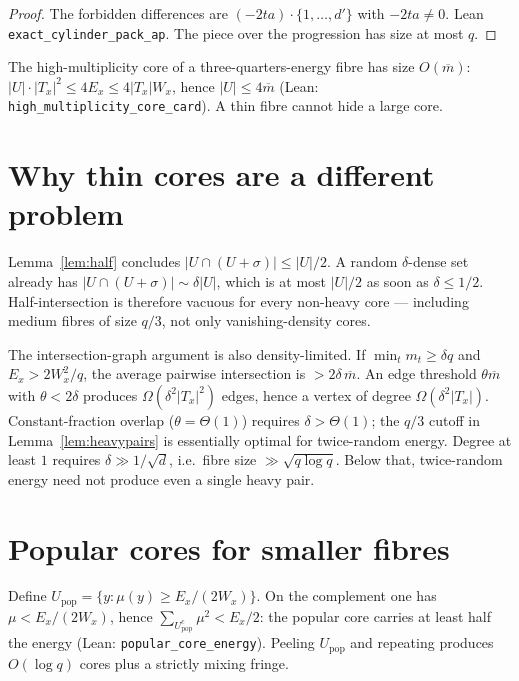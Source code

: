 \documentclass[11pt]{article}
\theoremstyle{definition}
\begin{document}
\begin{proof}
The forbidden differences are $(-2ta)\cdot\{1,\dots,d'\}$ with $-2ta\ne 0$.
Lean \texttt{exact\_cylinder\_pack\_ap}.
The piece over the progression has size at most $q$.
\end{proof}

The high-multiplicity core of a three-quarters-energy fibre has size
$O(\overline m)$:
$|U|\cdot|T_x|^{2}\le 4E_x\le 4|T_x|W_x$, hence $|U|\le 4\overline m$
(Lean: \texttt{high\_multiplicity\_core\_card}).
A thin fibre cannot hide a large core.

\section{Why thin cores are a different problem}

Lemma~\ref{lem:half} concludes $|U\cap(U+\sigma)|\le|U|/2$.
A random $\delta$-dense set already has $|U\cap(U+\sigma)|\sim\delta|U|$, which is at most $|U|/2$ as soon as $\delta\le 1/2$.
Half-intersection is therefore vacuous for every non-heavy core --- including
medium fibres of size $q/3$, not only vanishing-density cores.

The intersection-graph argument is also density-limited.
If $\min_t m_t\ge\delta q$ and $E_x>2W_x^{2}/q$, the average pairwise intersection is $>2\delta\,\overline m$.
An edge threshold $\theta\overline m$ with $\theta<2\delta$ produces $\Omega(\delta^{2}|T_x|^{2})$ edges, hence a vertex of degree $\Omega(\delta^{2}|T_x|)$.
Constant-fraction overlap ($\theta=\Theta(1)$) requires $\delta>\Theta(1)$; the $q/3$ cutoff in Lemma~\ref{lem:heavypairs} is essentially optimal for twice-random energy.
Degree at least $1$ requires $\delta\gg 1/\sqrt{d}$, i.e.\ fibre size $\gg\sqrt{q\log q}$.
Below that, twice-random energy need not produce even a single heavy pair.

\section{Popular cores for smaller fibres}

Define $U_{\mathrm{pop}}=\{y:\mu(y)\ge E_x/(2W_x)\}$.
On the complement one has $\mu<E_x/(2W_x)$, hence $\sum_{U_{\mathrm{pop}}^{c}}\mu^{2}<E_x/2$: the popular core carries at least half the energy
(Lean: \texttt{popular\_core\_energy}).
Peeling $U_{\mathrm{pop}}$ and repeating produces $O(\log q)$ cores plus a strictly mixing fringe.
\end{document}
